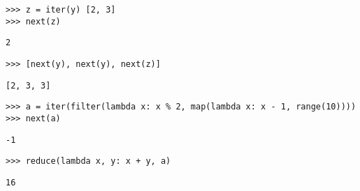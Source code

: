 \begin{blocksection}
\begin{lstlisting}
>>> z = iter(y) [2, 3]
>>> next(z)
\end{lstlisting}
\begin{solution}[0.2in]
\begin{lstlisting}
2
\end{lstlisting}
\end{solution}

\begin{lstlisting}
>>> [next(y), next(y), next(z)]
\end{lstlisting}
\begin{solution}[0.2in]
\begin{lstlisting}
[2, 3, 3]
\end{lstlisting}
\end{solution}

\begin{lstlisting}
>>> a = iter(filter(lambda x: x % 2, map(lambda x: x - 1, range(10))))
>>> next(a)
\end{lstlisting}
\begin{solution}[0.2in]
\begin{lstlisting}
-1
\end{lstlisting}
\end{solution}

\begin{lstlisting}
>>> reduce(lambda x, y: x + y, a)
\end{lstlisting}
\begin{solution}[0.2in]
\begin{lstlisting}
16
\end{lstlisting}
\end{solution}

\end{blocksection}